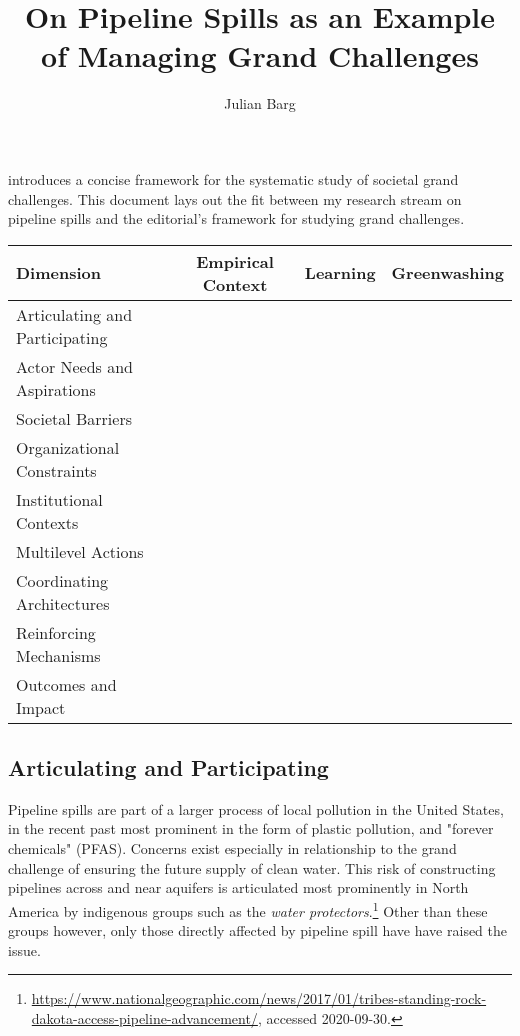 \documentclass{article}
\title{On Pipeline Spills as an Example of Managing Grand Challenges}
\author{Julian Barg}
\newcommand{\cmark}{\ding{51}}
\newcommand{\xmark}{\ding{55}}
\begin{document}
\maketitle

\citet{George2016} introduces a concise framework for the systematic study of societal grand challenges. This document lays out the fit between my research stream on pipeline spills and the editorial's framework for studying grand challenges.

\bigskip
\begin{small}
\centering
\begin{tabular}{l c c c}
	Dimension 					    & Empirical Context 	& Learning 	& Greenwashing 	\\
	\hline
	Articulating and Participating  & \cmark		   		& \xmark	& \xmark	\\
	Actor Needs and Aspirations		& \cmark				& \cmark	& \xmark	\\
	Societal Barriers				& \cmark				& \cmark	& \cmark	\\
	Organizational Constraints		& \cmark				& \cmark	& \xmark	\\
	Institutional Contexts			& \cmark				& \xmark	& \cmark	\\	
	Multilevel Actions				& \cmark				& \xmark	& \cmark	\\
	Coordinating Architectures		& \cmark				& \xmark	& \cmark	\\
	Reinforcing Mechanisms			& \cmark				& \cmark	& \cmark  	\\
	Outcomes and Impact				& \xmark				& \xmark	& \xmark	\\
	
\end{tabular}
	\end{small}

\subsection*{Articulating and Participating}

Pipeline spills are part of a larger process of local pollution in the United States, in the recent past most prominent in the form of plastic pollution, and "forever chemicals" (PFAS). Concerns exist especially in relationship to the grand challenge of ensuring the future supply of clean water. This risk of constructing pipelines across and near aquifers is articulated most prominently in North America by indigenous groups such as the \textit{water protectors}.\footnote{\url{https://www.nationalgeographic.com/news/2017/01/tribes-standing-rock-dakota-access-pipeline-advancement/}, accessed 2020-09-30.} Other than these groups however, only those directly affected by pipeline spill have have raised the issue. 
\end{document}
